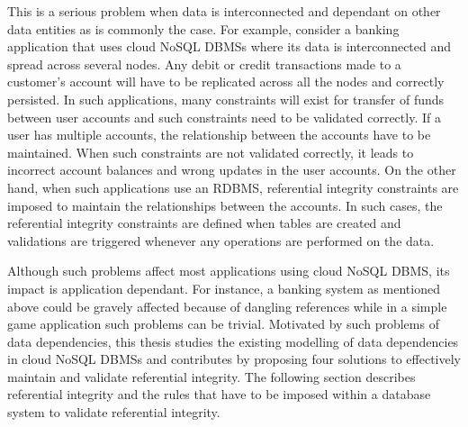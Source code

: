 This is a serious problem when data is interconnected and dependant on other
data entities as is commonly the case.  For example,   consider a banking
application that uses cloud \ac{NoSQL} \acp{DBMS} where its data is
interconnected and spread across several nodes.  Any debit or credit
transactions made to a customer's account will have to be replicated across all
the nodes and correctly persisted. In such applications, many constraints will
exist for transfer of funds between user accounts and such constraints need to
be validated correctly.
 If a user has multiple accounts,   the relationship between the accounts have
to be maintained.
When such constraints are not validated correctly,   it leads to incorrect
account balances and wrong updates in the user accounts.  On the other hand,  
when such applications use an \ac{RDBMS}, referential integrity constraints are
imposed to maintain the relationships between the accounts. In such cases, the
referential integrity constraints are defined when tables are created and
validations are triggered whenever any operations are performed on the data.

Although such problems  affect most applications using cloud \ac{NoSQL}
\ac{DBMS}, its impact is application dependant.  For instance,
a banking system as mentioned above could be gravely affected because of
dangling references while in a simple game application such problems can be
trivial.
Motivated by such problems of data dependencies, this thesis studies the
existing modelling of data dependencies in cloud \ac{NoSQL} \acp{DBMS} and
contributes by proposing four solutions to effectively maintain and validate
referential integrity.
The following section describes referential integrity and the rules that have to
be imposed within a database system to validate referential integrity.
\vfill
